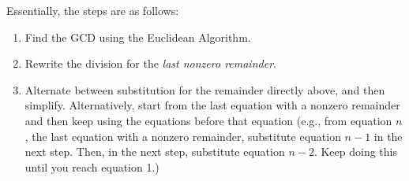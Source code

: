 \documentclass[letterpaper]{article}
\begin{document}
Essentially, the steps are as follows: 
\begin{enumerate}
    \item Find the GCD using the Euclidean Algorithm.
    \item Rewrite the division for the \emph{last nonzero remainder}. 
    \item Alternate between substitution for the remainder directly above, and then simplify. Alternatively, start from the last equation with a nonzero remainder and then keep using the equations before that equation (e.g., from equation $n$, the last equation with a nonzero remainder, substitute equation $n - 1$ in the next step. Then, in the next step, substitute equation $n - 2$. Keep doing this until you reach equation 1.)
\end{enumerate}
\end{document}
